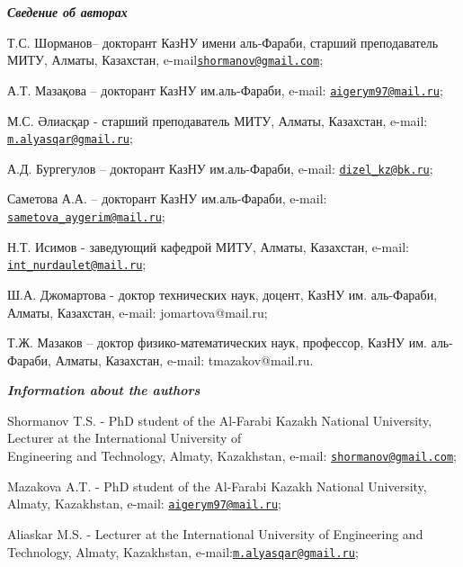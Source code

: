 \begin{authorinfo}
\hspace{1em}\emph{{\bfseries Сведение об авторах}}

Т.С. Шорманов-- докторант КазНУ имени аль-Фараби, старший преподаватель
МИТУ, Алматы, Казахстан, \linebreak e-mail\href{mailto:shormanov@gmail.com}{\nolinkurl{shormanov@gmail.com}};

А.Т. Мазақова -- докторант КазНУ им.аль-Фараби, e-mail:
\href{mailto:aigerym97@mail.ru}{\nolinkurl{aigerym97@mail.ru}};

М.С. Әлиасқар - старший преподаватель МИТУ, Алматы, Казахстан, e-mail:
\href{mailto:m.alyasqar@gmail.ru}{\nolinkurl{m.alyasqar@gmail.ru}};

А.Д. Бургегулов -- докторант КазНУ им.аль-Фараби, e-mail:
\href{mailto:dizel_kz@bk.ru}{\nolinkurl{dizel\_kz@bk.ru}};

Саметова А.А. -- докторант КазНУ им.аль-Фараби, e-mail:
\href{mailto:sametova_aygerim@mail.ru}{\nolinkurl{sametova\_aygerim@mail.ru}};

Н.Т. Исимов - заведующий кафедрой МИТУ, Алматы, Казахстан, e-mail:
\href{mailto:int_nurdaulet@mail.ru}{\nolinkurl{int\_nurdaulet@mail.ru}};

Ш.А. Джомартова - доктор технических наук, доцент, КазНУ им. аль-Фараби,
Алматы, Казахстан, \linebreak  e-mail: jomartova@mail.ru;

Т.Ж. Мазаков -- доктор физико-математических наук, профессор, КазНУ им.
аль-Фараби, Алматы, Казахстан, e-mail: tmazakov@mail.ru.

\hspace{1em}\emph{{\bfseries Information about the authors}}

Shormanov T.S. - PhD student of the Al-Farabi Kazakh National
University, Lecturer at the International University of \\Engineering and
Technology, Almaty, Kazakhstan, e-mail:
\href{mailto:shormanov@gmail.com}{\nolinkurl{shormanov@gmail.com}};

Mazakova A.T. - PhD student of the Al-Farabi Kazakh National University,
Almaty, Kazakhstan, e-mail:
\href{mailto:aigerym97@mail.ru}{\nolinkurl{aigerym97@mail.ru}};

Aliaskar M.S. - Lecturer at the International University of Engineering
and Technology, Almaty, Kazakhstan, \linebreak 
e-mail:\href{mailto:m.alyasqar@gmail.ru}{\nolinkurl{m.alyasqar@gmail.ru}};


\end{authorinfo}
